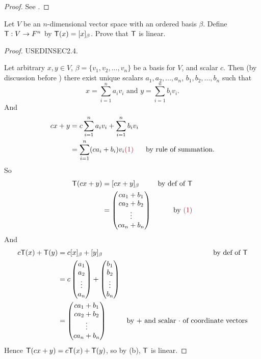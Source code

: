 \begin{proof}
See .
\end{proof}

\begin{exercise} \label{exercise 2.2.8}
Let \(V\) be an \(n\)-dimensional vector space with an ordered basis \(\beta\).
Define \(\textsf{T} : V \to F^n\) by \(\textsf{T}(x) = [x]_{\beta}\).
Prove that \(\textsf{T}\) is linear.
\end{exercise}

\begin{proof}
USEDINSEC2.4.

Let arbitrary \(x, y \in V\), \(\beta = \{ v_1, v_2, ..., v_n \}\) be a basis for \(V\), and scalar \(c\).
Then (by discussion before ) there exist unique scalars \(a_1, a_2, ..., a_n\), \(b_1, b_2, ..., b_n\) such that
\[
    x = \sum_{i = 1}^n a_i v_i \text{ and } y = \sum_{i = 1}^n b_i v_i.
\]
And
\begin{align*}
    cx + y & = c\sum_{i = 1}^n a_i v_i + \sum_{i = 1}^n b_i v_i \\
           & = \sum_{i = 1}^n (ca_i + b_i) v_i \MAROON{(1)} & \text{by rule of summation}.
\end{align*}
So
\begin{align*}
    \T(cx + y) & = [cx + y]_{\beta} & \text{by def of \(\T\)} \\
               & = \begin{pmatrix} ca_1 + b_1 \\ ca_2 + b_2 \\ \vdots \\ ca_n + b_n \end{pmatrix} & \text{by \MAROON{(1)}}
\end{align*}
And
\begin{align*}
    c\textsf{T}(x) + \textsf{T}(y) & = c[x]_{\beta} + [y]_{\beta} & \text{by def of \(\textsf{T}\)} \\
                   & = c \begin{pmatrix}
                        a_1 \\ a_2 \\ \vdots \\ a_n
                    \end{pmatrix}
                    + \begin{pmatrix}
                        b_1 \\ b_2 \\ \vdots \\ b_n
                    \end{pmatrix} \\
                   & = \begin{pmatrix} ca_1 + b_1 \\ ca_2 + b_2 \\ \vdots \\ ca_n + b_n \end{pmatrix} & \text{by \(+\) and scalar \(\cdot\) of coordinate vectors}
\end{align*}
Hence \(\textsf{T}(cx + y) = c\textsf{T}(x) + \textsf{T}(y)\), so by (b), \(\textsf{T}\) is linear.
\end{proof}

